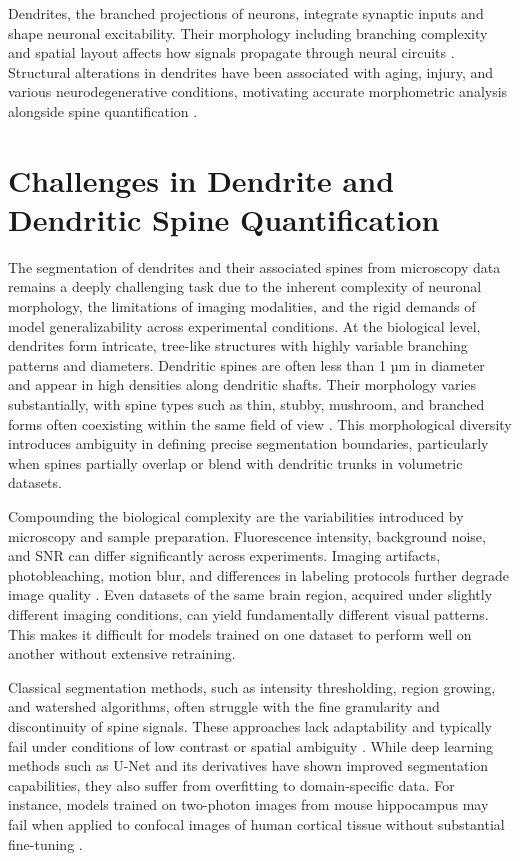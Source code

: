 Dendrites, the branched projections of neurons, integrate synaptic inputs and shape neuronal excitability. Their morphology including branching complexity and spatial layout affects how signals propagate through neural circuits \cite{Peng_2015}. Structural alterations in dendrites have been associated with aging, injury, and various neurodegenerative conditions, motivating accurate morphometric analysis alongside spine quantification \cite{Frank_2018}.

\section{Challenges in Dendrite and Dendritic Spine Quantification}
The segmentation of dendrites and their associated spines from microscopy data remains a deeply challenging task due to the inherent complexity of neuronal morphology, the limitations of imaging modalities, and the rigid demands of model generalizability across experimental conditions.
At the biological level, dendrites form intricate, tree-like structures with highly variable branching patterns and diameters. Dendritic spines are often less than 1 µm in diameter and appear in high densities along dendritic shafts. Their morphology varies substantially, with spine types such as thin, stubby, mushroom, and branched forms often coexisting within the same field of view \cite{Rodriguez_2008, Vidaurre_2022}. This morphological diversity introduces ambiguity in defining precise segmentation boundaries, particularly when spines partially overlap or blend with dendritic trunks in volumetric datasets.

Compounding the biological complexity are the variabilities introduced by microscopy and sample preparation. Fluorescence intensity, background noise, and \gls{SNR} can differ significantly across experiments. Imaging artifacts, photobleaching, motion blur, and differences in labeling protocols further degrade image quality \cite{Xiao_2018, Koh_2002}. Even datasets of the same brain region, acquired under slightly different imaging conditions, can yield fundamentally different visual patterns. This makes it difficult for models trained on one dataset to perform well on another without extensive retraining.

Classical segmentation methods, such as intensity thresholding, region growing, and watershed algorithms, often struggle with the fine granularity and discontinuity of spine signals. These approaches lack adaptability and typically fail under conditions of low contrast or spatial ambiguity \cite{Koh_2002}. While deep learning methods such as U-Net \cite{Ronneberger_2015} and its derivatives have shown improved segmentation capabilities, they also suffer from overfitting to domain-specific data. For instance, models trained on two-photon images from mouse hippocampus may fail when applied to confocal images of human cortical tissue without substantial fine-tuning \cite{Xiao_2018, Singh_2017}.

